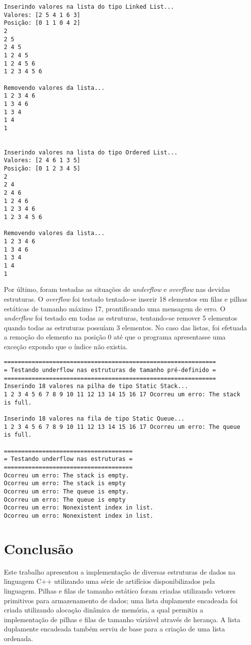 \begin{verbatim}
Inserindo valores na lista do tipo Linked List...
Valores: [2 5 4 1 6 3]
Posição: [0 1 1 0 4 2]
2
2 5
2 4 5
1 2 4 5
1 2 4 5 6
1 2 3 4 5 6

Removendo valores da lista...
1 2 3 4 6
1 3 4 6
1 3 4
1 4
1


Inserindo valores na lista do tipo Ordered List...
Valores: [2 4 6 1 3 5]
Posição: [0 1 2 3 4 5]
2
2 4
2 4 6
1 2 4 6
1 2 3 4 6
1 2 3 4 5 6

Removendo valores da lista...
1 2 3 4 6
1 3 4 6
1 3 4
1 4
1
\end{verbatim}

Por último, foram testadas as situações de \emph{underflow} e \emph{overflow} nas devidas estruturas. O \emph{overflow} foi testado tentado-se inserir 18 elementos em filas e pilhas estáticas de tamanho máximo 17, prontificando uma mensagem de erro. O \emph{underflow} foi testado em todas as estruturas, tentando-se remover 5 elementos quando todas as estruturas possuíam 3 elementos. No caso das listas, foi efetuada a remoção do elemento na posição 0 até que o programa apresentasse uma exceção expondo que o índice não existia.

\begin{verbatim}
=============================================================
= Testando underflow nas estruturas de tamanho pré-definido =
=============================================================
Inserindo 18 valores na pilha de tipo Static Stack...
1 2 3 4 5 6 7 8 9 10 11 12 13 14 15 16 17 Ocorreu um erro: The stack is full.

Inserindo 18 valores na fila de tipo Static Queue...
1 2 3 4 5 6 7 8 9 10 11 12 13 14 15 16 17 Ocorreu um erro: The queue is full.

=====================================
= Testando underflow nas estruturas =
=====================================
Ocorreu um erro: The stack is empty.
Ocorreu um erro: The stack is empty
Ocorreu um erro: The queue is empty.
Ocorreu um erro: The queue is empty
Ocorreu um erro: Nonexistent index in list.
Ocorreu um erro: Nonexistent index in list.
\end{verbatim}

\chapter{Conclusão}

Este trabalho apresentou a implementação de diversas estruturas de dados na linguagem C++ utilizando uma série de artifícios disponibilizados pela linguagem. Pilhas e filas de tamanho estático foram criadas utilizando vetores primitivos para armazenamento de dados; uma lista duplamente encadeada foi criada utilizando alocação dinâmica de memória, a qual permitiu a implementação de pilhas e filas de tamanho váriável através de herança. A lista duplamente encadeada também serviu de base para a criação de uma lista ordenada.

